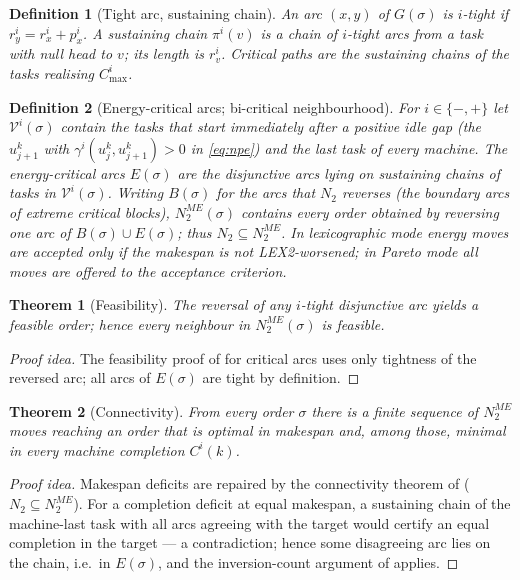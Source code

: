 \documentclass[preprint,12pt]{elsarticle}
\newtheorem{theorem}{Theorem}
\newtheorem{definition}{Definition}
\begin{document}
\begin{definition}[Tight arc, sustaining chain]
An arc $(x,y)$ of $G(\sigma)$ is \emph{$i$-tight} if $r^i_y=r^i_x+p^i_x$.
A \emph{sustaining chain} $\pi^i(v)$ is a chain of $i$-tight arcs from a
task with null head to $v$; its length is $r^i_v$. Critical paths are the
sustaining chains of the tasks realising $C^i_{\max}$.
\end{definition}

\begin{definition}[Energy-critical arcs; bi-critical neighbourhood]
\label{def:n2me}
For $i\in\{-,+\}$ let $\mathcal{V}^i(\sigma)$ contain the tasks that start
immediately after a positive idle gap (the $u^k_{j+1}$ with
$\gamma^i(u^k_j,u^k_{j+1})>0$ in \eqref{eq:npe}) and the last task of every
machine. The energy-critical
arcs $E(\sigma)$ are the disjunctive arcs lying on sustaining chains of
tasks in $\mathcal{V}^i(\sigma)$. Writing $B(\sigma)$ for the arcs that
$N_2$ reverses (the boundary arcs of extreme critical blocks),
$N_2^{ME}(\sigma)$ contains every order obtained by reversing one arc of
$B(\sigma)\cup E(\sigma)$; thus $N_2\subseteq N_2^{ME}$. In
\emph{lexicographic mode} energy moves are accepted only if the makespan is
not LEX2-worsened; in \emph{Pareto mode} all moves are offered to the
acceptance criterion.
\end{definition}

\begin{theorem}[Feasibility]
The reversal of any $i$-tight disjunctive arc yields a feasible order;
hence every neighbour in $N_2^{ME}(\sigma)$ is feasible.
\end{theorem}
\begin{proof}[Proof idea]
The feasibility proof of \cite{DiazTabu2026} for critical arcs uses only
tightness of the reversed arc; all arcs of $E(\sigma)$ are tight by
definition. \end{proof}

\begin{theorem}[Connectivity]
\label{thm:connectivity}
From every order $\sigma$ there is a finite sequence of $N_2^{ME}$ moves
reaching an order that is optimal in makespan and, among those, minimal in
every machine completion $C^i(k)$.
\end{theorem}
\begin{proof}[Proof idea]
Makespan deficits are repaired by the connectivity theorem of
\cite{DiazTabu2026} ($N_2\subseteq N_2^{ME}$). For a completion deficit at
equal makespan, a sustaining chain of the machine-last task with all arcs
agreeing with the target would certify an equal completion in the target
--- a contradiction; hence some disagreeing arc lies on the chain, i.e.\ in
$E(\sigma)$, and the inversion-count argument of \cite{DiazTabu2026}
applies. \end{proof}
\end{document}
